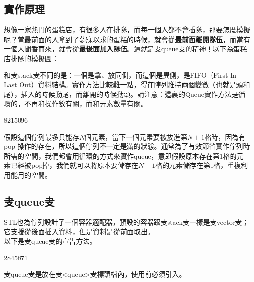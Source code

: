 \documentclass[main.tex]{subfiles}
\begin{document}
\subsection{實作原理}
想像一家熱門的蛋糕店，有很多人在排隊，而每一個人都不會插隊，那要怎麼模擬呢？當最前面的人拿到了夢寐以求的蛋糕的時候，就會從\textbf{最前面離開隊伍}，而當有一個人聞香而來，就會從\textbf{最後面加入隊伍}。這就是叏queue叏的精神！以下為蛋糕店排隊的模擬圖：
\begin{center}
\end{center}
和叏stack叏不同的是：一個是拿、放同側，而這個是異側，是FIFO（First In Last Out）資料結構。實作方法比較難一點，得在陣列維持兩個變數（也就是頭和尾），插入的時候動尾，而離開的時候動頭。請注意：這裏的Queue實作方法是循環的，不再和操作數有關，而和元素數量有關。
\begin{C++}8215096\end{C++}
\indent\indent 假設這個佇列最多只能存$N$個元素，當下一個元素要被放進第$N+1$格時，因為有 pop 操作的存在，所以這個佇列不一定是滿的狀態。通常為了有效節省實作佇列時所需的空間，我們都會用循環的方式來實作queue，意即假設原本存在第$1$格的元素已經被pop掉，我們就可以將原本要儲存在$N+1$格的元素儲存在第$1$格，重複利用能用的空間。

\subsection{叏queue叏}
STL也為佇列設計了一個容器適配器，預設的容器跟叏stack叏一樣是叏vector叏；它支援從後面插入資料，但是資料是從前面取出。\\
\indent 以下是叏queue叏的宣告方法。
\begin{C++}2845871\end{C++}
\indent\indent 叏queue叏是放在叏<queue>叏標頭檔內，使用前必須引入。
\end{document}
